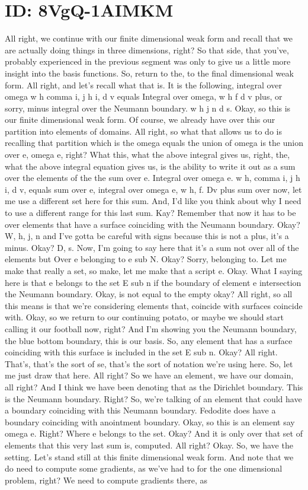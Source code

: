 \documentclass[10pt]{article}
\begin{document}
\section*{ID: 8VgQ-1AIMKM}
All right, we continue with our finite dimensional weak form and recall that we are actually doing things in three dimensions, right? So that side, that you've, probably experienced in the previous segment was only to give us a little more insight into the basis functions. So, return to the, to the final dimensional weak form. All right, and let's recall what that is. It is the following, integral over omega w h comma i, j h i, d v equals Integral over omega, w h f d v plus, or sorry, minus integral over the Neumann boundary. w h j n d s. Okay, so this is our finite dimensional weak form. Of course, we already have over this our partition into elements of domains. All right, so what that allows us to do is recalling that partition which is the omega equals the union of omega is the union over e, omega e, right? What this, what the above integral gives us, right, the, what the above integral equation gives us, is the ability to write it out as a sum over the elements of the the sum over e. Integral over omega e. w h, comma i, j h i, d v, equals sum over e, integral over omega e, w h, f. Dv plus sum over now, let me use a different set here for this sum. And, I'd like you think about why I need to use a different range for this last sum. Kay? Remember that now it has to be over elements that have a surface coinciding with the Neumann boundary. Okay? W, h, j, n and I've gotta be careful with signs because this is not a plus, it's a minus. Okay? D, s. Now, I'm going to say here that it's a sum not over all of the elements but Over e belonging to e sub N. Okay? Sorry, belonging to. Let me make that really a set, so make, let me make that a script e. Okay. What I saying here is that e belongs to the set E sub n if the boundary of element e intersection the Neumann boundary. Okay, is not equal to the empty okay? All right, so all this means is that we're considering elements that, coincide with surfaces coincide with. Okay, so we return to our continuing potato, or maybe we should start calling it our football now, right? And I'm showing you the Neumann boundary, the blue bottom boundary, this is our basis. So, any element that has a surface coinciding with this surface is included in the set E sub n. Okay? All right. That's, that's the sort of se, that's the sort of notation we're using here. So, let me just draw that here. All right? So we have an element, we have our domain, all right? And I think we have been denoting that as the Dirichlet boundary. This is the Neumann boundary. Right? So, we're talking of an element that could have a boundary coinciding with this Neumann boundary. Fedodite does have a boundary coinciding with anointment boundary. Okay, so this is an element say omega e. Right? Where e belongs to the set. Okay? And it is only over that set of elements that this very last sum is, computed. All right? Okay. So, we have the setting. Let's stand still at this finite dimensional weak form. And note that we do need to compute some gradients, as we've had to for the one dimensional problem, right? We need to compute gradients there, as 
\end{document}
